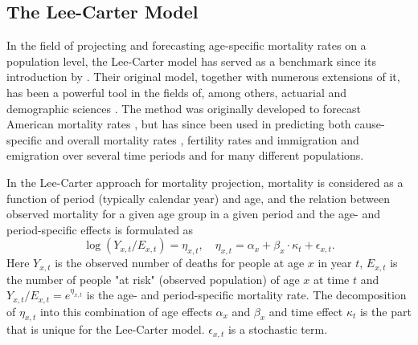 \subsection{The Lee-Carter Model}
\label{section:Lee-Carter}
In the field of projecting and forecasting age-specific mortality rates on a population level, the Lee-Carter model has served as a benchmark since its introduction by \textcite{LeeCarter1992}. Their original model, together with numerous extensions of it, has been a powerful tool in the fields of, among others, actuarial and demographic sciences \parencite{booth_tickle_2008}. The method was originally developed to forecast American mortality rates \parencite{LeeCarter1992}, but has since been used in predicting both cause-specific and overall mortality rates \parencite{GirosiKing2007}, fertility rates and immigration and emigration \parencite{Wisniowski2015} over several time periods and for many different populations. 

\newpar In the Lee-Carter approach for mortality projection, mortality is considered as a function of period (typically calendar year) and age, and the relation between observed mortality for a given age group in a given period and the age- and period-specific effects is formulated as 
\begin{equation}
\log(Y_{x,t}/E_{x,t})  = \eta_{x,t}, \quad \eta_{x,t}= \alpha_x + \beta_x\cdot\kappa_t + \epsilon_{x,t}.
\label{eq:orig-LC-model}
\end{equation}
Here $Y_{x,t}$ is the observed number of deaths for people at age $x$ in year $t$, $E_{x,t}$ is the number of people "at risk" (observed population) of age $x$ at time $t$ and $Y_{x,t}/E_{x,t} = e^{\eta_{x,t}}$ is the age- and period-specific mortality rate. The decomposition of $\eta_{x,t}$ into this combination of age effects $\alpha_x$ and $\beta_x$ and time effect $\kappa_t$ is the part that is unique for the Lee-Carter model. $\epsilon_{x,t}$ is a stochastic term.


